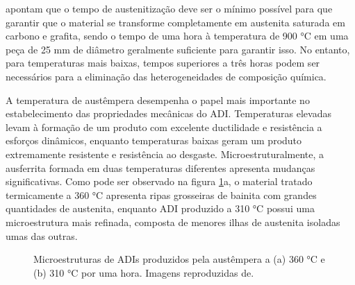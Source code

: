  apontam que o tempo de austenitização deve ser o mínimo possível para que garantir que o material se transforme completamente em austenita saturada em carbono e grafita, sendo o tempo de uma hora à temperatura de 900 °C em uma peça de 25 mm de diâmetro geralmente suficiente para garantir isso. No entanto, para temperaturas mais baixas, tempos superiores a três horas podem ser necessários para a eliminação das heterogeneidades de composição química.

A temperatura de austêmpera desempenha o papel mais importante no estabelecimento das propriedades mecânicas do ADI. Temperaturas elevadas levam à formação de um produto com excelente ductilidade e resistência a esforços dinâmicos, enquanto temperaturas baixas geram um produto extremamente resistente e resistência ao desgaste\cite{Lin1996,Aranzabal1997,Magalhaes1998}. Microestruturalmente, a ausferrita formada em duas temperaturas diferentes apresenta mudanças significativas. Como pode ser observado na figura \ref{fig:ADIs}a, o material tratado termicamente a 360 °C apresenta ripas grosseiras de bainita com grandes quantidades de austenita, enquanto ADI produzido a 310 °C possui uma microestrutura mais refinada, composta de menores ilhas de austenita isoladas umas das outras.

\begin{figure}
	\quad
	\caption{Microestruturas de ADIs produzidos pela austêmpera a (a) 360 °C e (b) 310 °C por uma hora. Imagens reproduzidas de\cite{Trudel1997}.}
	\label{fig:ADIs}
\end{figure}

